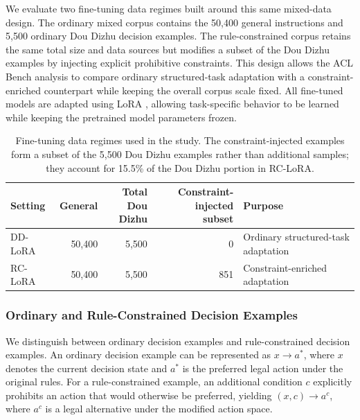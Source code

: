 We evaluate two fine-tuning data regimes built around this same mixed-data design. The ordinary mixed corpus contains the 50,400 general instructions and 5,500 ordinary Dou Dizhu decision examples. The rule-constrained corpus retains the same total size and data sources but modifies a subset of the Dou Dizhu examples by injecting explicit prohibitive constraints. This design allows the ACL Bench analysis to compare ordinary structured-task adaptation with a constraint-enriched counterpart while keeping the overall corpus scale fixed. All fine-tuned models are adapted using LoRA \cite{hu2022lora}, allowing task-specific behavior to be learned while keeping the pretrained model parameters frozen.

\begin{table}[t]
\centering
\caption{Fine-tuning data regimes used in the study. The constraint-injected examples form a subset of the 5,500 Dou Dizhu examples rather than additional samples; they account for 15.5\% of the Dou Dizhu portion in RC-LoRA.}
\label{tab:training_corpora}
\begin{tabularx}{\linewidth}{@{}lrrr>{\raggedright\arraybackslash}X@{}}
\toprule
\rowcolor{NeutralCell}
Setting & General & \shortstack{Total Dou\\Dizhu} & \shortstack{Constraint-injected\\subset} & Purpose \\
\midrule
DD-LoRA & 50,400 & 5,500 & 0 & Ordinary structured-task adaptation \\
RC-LoRA & 50,400 & 5,500 & 851 & Constraint-enriched adaptation \\
\bottomrule
\end{tabularx}
\end{table}

\subsubsection{Ordinary and Rule-Constrained Decision Examples}

We distinguish between ordinary decision examples and rule-constrained decision examples. An ordinary decision example can be represented as $x \rightarrow a^{*}$, where $x$ denotes the current decision state and $a^{*}$ is the preferred legal action under the original rules. For a rule-constrained example, an additional condition $c$ explicitly prohibits an action that would otherwise be preferred, yielding $(x,c) \rightarrow a^{c}$, where $a^{c}$ is a legal alternative under the modified action space.


